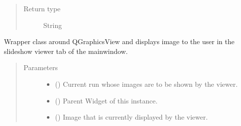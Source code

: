 \documentclass[letterpaper,10pt,english]{sphinxmanual}
\begin{document}
\begin{fulllineitems}
\begin{fulllineitems}
\begin{quote}
\begin{description}
\item[{Return type}] \leavevmode
String

\end{description}\end{quote}

\end{fulllineitems}


\begin{fulllineitems}
\label{\detokenize{polo.widgets:polo.widgets.slideshow_viewer.SlideshowViewer.get_cur_img_meta_str}}
\end{fulllineitems}


\begin{fulllineitems}
\label{\detokenize{polo.widgets:polo.widgets.slideshow_viewer.SlideshowViewer.photoClicked}}
Wrapper class around QGraphicsView and displays image to the user
in the slideshow viewer tab of the mainwindow.
\begin{quote}\begin{description}
\item[{Parameters}] \leavevmode\begin{itemize}
\item {} 
 ({\hyperref[\detokenize{polo.crystallography:polo.crystallography.run.Run}]{}}) \textendash{} Current run whose images are to be shown by the viewer.

\item {} 
 () \textendash{} Parent Widget of this instance.

\item {} 
 ({\hyperref[\detokenize{polo.crystallography:polo.crystallography.image.Image}]{}}) \textendash{} Image that is currently displayed by the viewer.


\end{itemize}
\end{description}
\end{quote}
\end{fulllineitems}
\end{fulllineitems}
\end{document}
